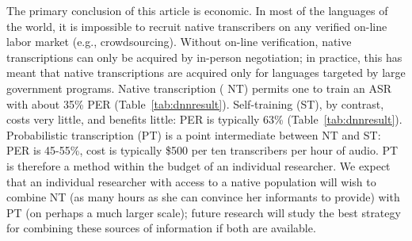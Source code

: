 {\color{blue} The primary conclusion of this article is economic.  In
  most of the languages of the world, it is impossible to recruit
  native transcribers on any verified on-line labor market (e.g.,
  crowdsourcing).  Without on-line verification, native transcriptions
  can only be acquired by in-person negotiation; in practice, this has
  meant that native transcriptions are acquired only for languages
  targeted by large government programs.  Native transcription ({\sc
    NT}) permits one to train an ASR with about 35\% PER
  (Table~\ref{tab:dnnresult}).  Self-training ({\sc ST}), by contrast,
  costs very little, and benefits little: PER is typically 63\%
  (Table~\ref{tab:dnnresult}).  Probabilistic transcription ({\sc PT})
  is a point intermediate between {\sc NT} and {\sc ST}: PER is
  45-55\%, cost is typically \$500 per ten transcribers per hour of
  audio. {\sc PT} is therefore a method within the budget of an
  individual researcher.  We expect that an individual researcher with
  access to a native population will wish to combine {\sc NT} (as many
  hours as she can convince her informants to provide) with {\sc PT}
  (on perhaps a much larger scale); future research will study the
  best strategy for combining these sources of information if both are
  available.}


